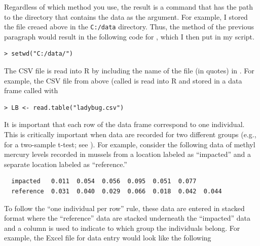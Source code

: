 \documentclass[10pt,openany]{book}\usepackage[]{graphicx}\usepackage[]{color}
\makeatletter
\newenvironment{kframe}{%
 \def\at@end@of@kframe{}%
 \ifinner\ifhmode%
  \def\at@end@of@kframe{\end{minipage}}%
  \begin{minipage}{\columnwidth}%
 \fi\fi%
 \def\FrameCommand##1{\hskip\@totalleftmargin \hskip-\fboxsep
 \colorbox{shadecolor}{##1}\hskip-\fboxsep
     \hskip-\linewidth \hskip-\@totalleftmargin \hskip\columnwidth}%
 \MakeFramed {\advance\hsize-\width
   \@totalleftmargin\z@ \linewidth\hsize
   \@setminipage}}%
 {\par\unskip\endMakeFramed%
 \at@end@of@kframe}
\newenvironment{knitrout}{}{} %
\makeatother
\begin{document}
Regardless of which method you use, the result is a  command that has the path to the directory that contains the data as the argument.  For example, I stored the file creaed above in the \verb"C:/data" directory.  Thus, the method of the previous paragraph would result in the following code for , which I then put in my script.

\begin{knitrout}
\color{fgcolor}\begin{kframe}
\begin{verbatim}
> setwd("C:/data/")
\end{verbatim}
\end{kframe}
\end{knitrout}

The CSV file is read into R by including the name of the file (in quotes) in .  For example, the CSV file from above (called  is read into R and stored in a data frame called  with
\begin{knitrout}
\color{fgcolor}\begin{kframe}
\begin{verbatim}
> LB <- read.table("ladybug.csv")
\end{verbatim}
\end{kframe}
\end{knitrout}


It is important that each row of the data frame correspond to one individual.  This is critically important when data are recorded for two different groups (e.g., for a two-sample t-test; see ).  For example, consider the following data of methyl mercury levels recorded in mussels from a location labeled as ``impacted'' and a separate location labeled as ``reference.''
\begin{Verbatim}
  impacted   0.011  0.054  0.056  0.095  0.051  0.077
  reference  0.031  0.040  0.029  0.066  0.018  0.042  0.044
\end{Verbatim}
To follow the ``one individual per row'' rule, these data are entered in stacked format where the ``reference'' data are stacked underneath the ``impacted'' data and a column is used to indicate to which group the individuals belong.  For example, the Excel file for data entry would look like the following
\end{document}
